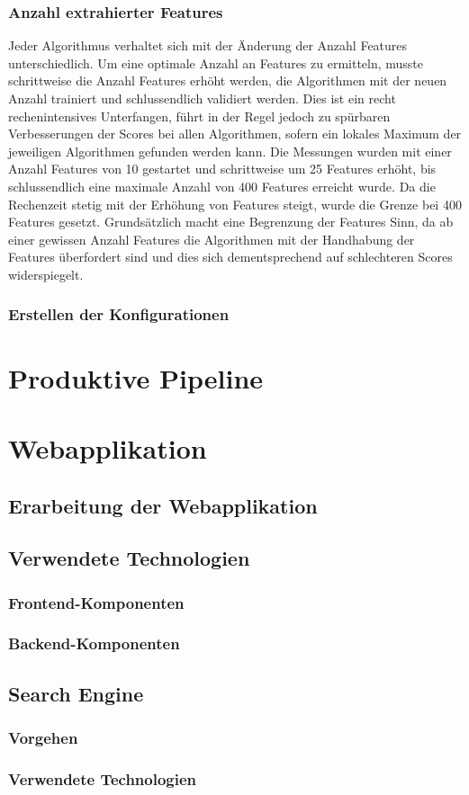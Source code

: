 \subsubsection{Anzahl extrahierter Features}
Jeder Algorithmus verhaltet sich mit der Änderung der Anzahl Features unterschiedlich.
Um eine optimale Anzahl an Features zu ermitteln, musste schrittweise die Anzahl Features erhöht werden, die Algorithmen mit der neuen Anzahl trainiert und schlussendlich validiert werden.
Dies ist ein recht rechenintensives Unterfangen, führt in der Regel jedoch zu spürbaren Verbesserungen der Scores bei allen Algorithmen, sofern ein lokales Maximum der jeweiligen Algorithmen gefunden werden kann.
Die Messungen wurden mit einer Anzahl Features von 10 gestartet und schrittweise um 25 Features erhöht, bis schlussendlich eine maximale Anzahl von 400 Features erreicht wurde.
Da die Rechenzeit stetig mit der Erhöhung von Features steigt, wurde die Grenze bei 400 Features gesetzt.
Grundsätzlich macht eine Begrenzung der Features Sinn, da ab einer gewissen Anzahl Features die Algorithmen mit der Handhabung der Features überfordert sind und dies sich dementsprechend auf schlechteren Scores widerspiegelt.
\subsubsection{Erstellen der Konfigurationen}
\section{Produktive Pipeline}
\section{Webapplikation}
\subsection{Erarbeitung der Webapplikation}
\subsection{Verwendete Technologien}
\subsubsection{Frontend-Komponenten}
\subsubsection{Backend-Komponenten}
\subsection{Search Engine}
\subsubsection{Vorgehen}
\subsubsection{Verwendete Technologien}